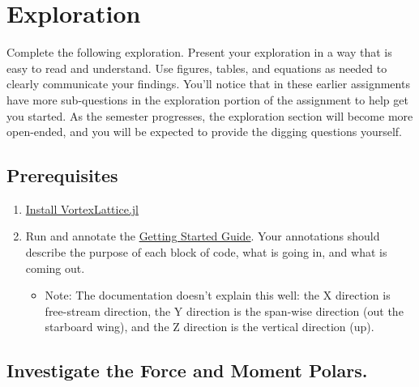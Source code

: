 \documentclass[11pt]{article}
\begin{document}
\section{Exploration}
\label{sec:exploration}

Complete the following exploration. Present your exploration in a way that is easy to read and understand. Use figures, tables, and equations as needed to clearly communicate your findings. You'll notice that in these earlier assignments have more sub-questions in the exploration portion of the assignment to help get you started. As the semester progresses, the exploration section will become more open-ended, and you will be expected to provide the digging questions yourself.

\subsection{Prerequisites}
\label{ssec:prereqs}

\begin{enumerate}[label=\roman*.]
	\item \href{https://flow.byu.edu/VortexLattice.jl/stable/#Installation}{Install VortexLattice.jl}
	\item Run and annotate the \href{https://flow.byu.edu/VortexLattice.jl/stable/guide/}{Getting Started Guide}. Your annotations should describe the purpose of each block of code, what is going in, and what is coming out. 
	\begin{itemize}
		\item Note: The documentation doesn't explain this well: the X direction is free-stream direction, the Y direction is the span-wise direction (out the starboard wing), and the Z direction is the vertical direction (up).
	\end{itemize}
\end{enumerate}


\subsection{Investigate the Force and Moment Polars.}
\end{document}
